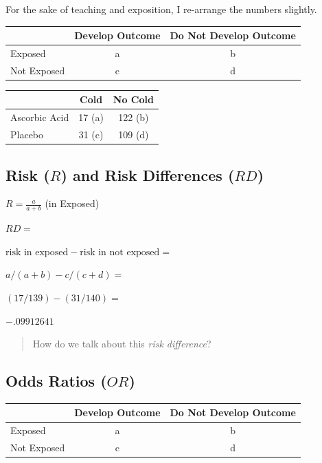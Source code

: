 \documentclass[
  letterpaper,
  DIV=11,
  numbers=noendperiod]{scrartcl}
\begin{document}
For the sake of teaching and exposition, I re-arrange the numbers
slightly.

\begin{longtable}[]{@{}lcc@{}}
\toprule\noalign{}
& Develop Outcome & Do Not Develop Outcome \\
\midrule\noalign{}
\endhead
\bottomrule\noalign{}
\endlastfoot
Exposed & a & b \\
Not Exposed & c & d \\
\end{longtable}

\begin{longtable}[]{@{}lcc@{}}
\toprule\noalign{}
& Cold & No Cold \\
\midrule\noalign{}
\endhead
\bottomrule\noalign{}
\endlastfoot
Ascorbic Acid & 17 (a) & 122 (b) \\
Placebo & 31 (c) & 109 (d) \\
\end{longtable}

\hypertarget{risk-r-and-risk-differences-rd}{%
\subsection{\texorpdfstring{Risk (\(R\)) and Risk Differences
(\(RD\))}{Risk (R) and Risk Differences (RD)}}\label{risk-r-and-risk-differences-rd}}

\(R = \frac{a}{a+b}\) (in Exposed)

\(RD =\)

\(\text{risk in exposed} - \text{risk in not exposed} =\)

\(a/(a+b) - c/(c+d) =\)

\((17/139) - (31/140) =\)

\(-.09912641\)

\begin{quote}
How do we talk about this \emph{risk difference}?
\end{quote}

\hypertarget{odds-ratios-or}{%
\subsection{\texorpdfstring{Odds Ratios
(\(OR\))}{Odds Ratios (OR)}}\label{odds-ratios-or}}

\begin{longtable}[]{@{}lcc@{}}
\toprule\noalign{}
& Develop Outcome & Do Not Develop Outcome \\
\midrule\noalign{}
\endhead
\bottomrule\noalign{}
\endlastfoot
Exposed & a & b \\
Not Exposed & c & d \\
\end{longtable}
\end{document}
